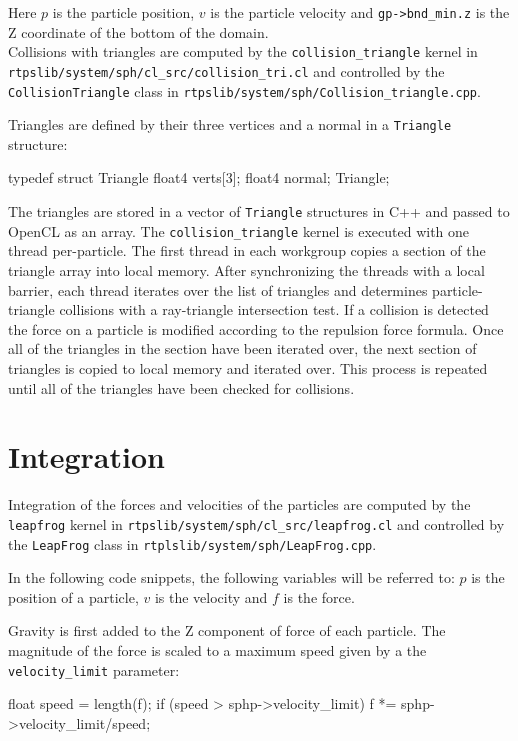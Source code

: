 Here $p$ is the particle position, $v$ is the particle velocity and
\verb|gp->bnd_min.z| is the Z coordinate of the bottom of the domain.
\\

Collisions with triangles are computed by the \verb|collision_triangle| kernel in
\\ \verb|rtpslib/system/sph/cl_src/collision_tri.cl| and controlled by the
\verb|CollisionTriangle| class in \verb|rtpslib/system/sph/Collision_triangle.cpp|.

Triangles are defined by their three vertices and a normal in a \verb|Triangle| structure:
\begin{cppcode}{0}
typedef struct Triangle
{
    float4 verts[3];
    float4 normal;
} Triangle;
\end{cppcode}

The triangles are stored in a vector of \verb|Triangle| structures in C++ and
passed to OpenCL as an array. The \verb|collision_triangle| kernel is executed
with one thread per-particle. The first thread in each workgroup copies a section of the
triangle array into local memory. After synchronizing the threads with a local
barrier, each thread iterates over the list of triangles and determines
particle-triangle collisions with a ray-triangle intersection
test.\cite{Ericson} If a collision is detected the force on a particle is
modified according to the repulsion force formula. Once all of the triangles in
the section have been iterated over, the next section of triangles is copied to
local memory and iterated over. This process is repeated until all of the
triangles have been checked for collisions.


\section{Integration}

Integration of the forces and velocities of the particles are computed by the
\verb|leapfrog| kernel in \verb|rtpslib/system/sph/cl_src/leapfrog.cl| and
controlled by the \verb|LeapFrog| class in
\verb|rtplslib/system/sph/LeapFrog.cpp|.

In the following code snippets, the following variables will be referred to:
$p$ is the position of a particle, $v$ is the velocity and $f$ is the force.


Gravity is first added to the Z component of force of each particle. The
magnitude of the force is scaled to a maximum speed given by a the \verb|velocity_limit| parameter:
\begin{cppcode}{0}
float speed = length(f);
if (speed > sphp->velocity_limit) 
{
    f *= sphp->velocity_limit/speed;
}
\end{cppcode}

